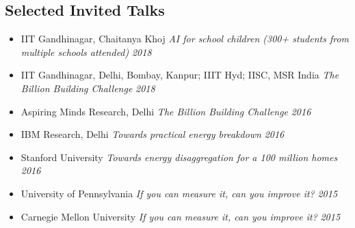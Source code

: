 \documentclass[letter,10pt]{article}
\begin{document}
\begin{itemize}

\end{itemize}


\subsection*{\sc \textbf{Selected Invited Talks}\hspace{5pt}\noindent\hrulefill}

\begin{itemize}
      \item[] {IIT Gandhinagar, Chaitanya Khoj}
	 \textit{AI for school children (300+ students from multiple schools attended)} \hfill \textit{2018}
      \item[] {IIT Gandhinagar, Delhi, Bombay, Kanpur; IIIT Hyd; IISC, MSR India}
	 \textit{The Billion Building Challenge} \hfill \textit{2018}
     \item[] {Aspiring Minds Research, Delhi}
	 \textit{The Billion Building Challenge} \hfill \textit{2016}
    \item[] {IBM Research, Delhi}
	 \textit{Towards practical energy breakdown} \hfill \textit{2016}
	
	\item[] {Stanford University}
	\textit{Towards energy disaggregation for a 100 million homes} \hfill \textit{2016}
	\item[] {University of Pennsylvania}
	\textit{If you can measure it, can you improve it?} \hfill \textit{2015}
	\item[] {Carnegie Mellon University}
	\textit{If you can measure it, can you improve it?} \hfill \textit{2015}
	
\end{itemize}
\end{document}

